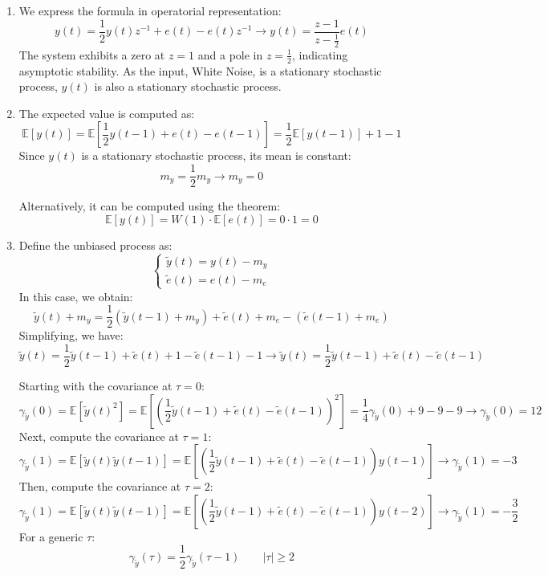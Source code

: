 \begin{enumerate}
    \item We express the formula in operatorial representation:
        \[y(t)=\dfrac{1}{2}y(t)z^{-1}+e(t)-e(t)z^{-1}\rightarrow y(t)=\dfrac{z-1}{z-\frac{1}{2}}e(t)\]
        The system exhibits a zero at $z=1$ and a pole in $z=\frac{1}{2}$, indicating asymptotic stability.
        As the input, White Noise, is a stationary stochastic process, $y(t)$ is also a stationary stochastic process.
    \item The expected value is computed as:
        \[\mathbb{E}\left[ y(t) \right]=\mathbb{E}\left[ \dfrac{1}{2}y(t-1)+e(t)-e(t-1) \right]=\dfrac{1}{2}\mathbb{E}\left[ y(t-1)\right] + 1 - 1\]
        Since $y(t)$ is a stationary stochastic process, its mean is constant:
        \[m_y=\dfrac{1}{2}m_y \rightarrow m_y=0\]

        Alternatively, it can be computed using the theorem: 
        \[\mathbb{E}\left[ y(t) \right]=W(1)\cdot\mathbb{E}\left[ e(t) \right]=0\cdot 1=0\]
    \item Define the unbiased process as: 
        \[\begin{cases}
            \tilde{y}(t)=y(t)-m_y \\
            \tilde{e}(t)=e(t)-m_e
        \end{cases}\]
        In this case, we obtain: 
        \[\tilde{y}(t)+m_y=\dfrac{1}{2}\left(\tilde{y}(t-1)+m_y\right)+\tilde{e}(t)+m_e-\left(\tilde{e}(t-1)+m_e\right)\]
        Simplifying, we have: 
        \[\tilde{y}(t)=\dfrac{1}{2}\tilde{y}(t-1)+\tilde{e}(t)+1-\tilde{e}(t-1)-1\rightarrow\tilde{y}(t)=\dfrac{1}{2}\tilde{y}(t-1)+\tilde{e}(t)-\tilde{e}(t-1)\]

        Starting with the covariance at $\tau=0$: 
        \[\gamma_{\tilde{y}}(0)=\mathbb{E}\left[\tilde{y}(t)^2\right]=\mathbb{E}\left[ \left(\dfrac{1}{2}\tilde{y}(t-1)+\tilde{e}(t)-\tilde{e}(t-1)\right)^2\right]=\dfrac{1}{4}\gamma_{\tilde{y}}(0) +9-9 - 9\rightarrow \gamma_{\tilde{y}}(0)=12\]
        Next, compute the covariance at $\tau=1$: 
        \[\gamma_{\tilde{y}}(1)=\mathbb{E}\left[ \tilde{y}(t)\tilde{y}(t-1)\right]=\mathbb{E}\left[ \left(\dfrac{1}{2}\tilde{y}(t-1)+\tilde{e}(t)-\tilde{e}(t-1)\right)y(t-1)\right]\rightarrow \gamma_{\tilde{y}}(1)=-3\]
        Then, compute the covariance at $\tau=2$: 
        \[\gamma_{\tilde{y}}(1)=\mathbb{E}\left[ \tilde{y}(t)\tilde{y}(t-1)\right]=\mathbb{E}\left[ \left(\dfrac{1}{2}\tilde{y}(t-1)+\tilde{e}(t)-\tilde{e}(t-1)\right)y(t-2)\right]\rightarrow \gamma_{\tilde{y}}(1)=-\dfrac{3}{2}\]
        For a generic $\tau$: 
        \[\gamma_{\tilde{y}}(\tau)=\dfrac{1}{2}\gamma_{\tilde{y}}(\tau-1) \qquad \left\lvert \tau \right\rvert \geq 2\]
\end{enumerate}